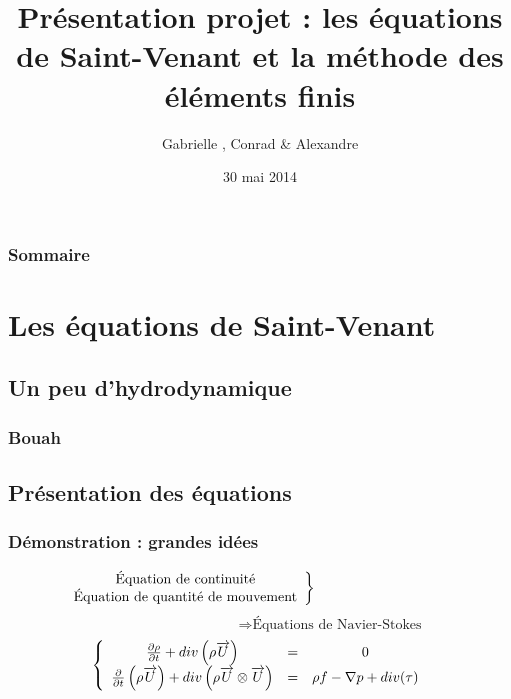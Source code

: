 \documentclass[handout]{beamer}
\title[Saint-Venant]{Présentation projet : les équations de Saint-Venant et la méthode des éléments finis}
\author{Gabrielle \bsc{Collette}, Conrad \bsc{Hillairet} \& Alexandre \bsc{Vieira}}
\institute{INSA de Rouen}
\date{30 mai 2014}
\begin{document}
\begin{frame}
\titlepage
\end{frame}

\begin{frame}
	\frametitle{Sommaire}
	\tableofcontents
\end{frame}

\section{Les équations de Saint-Venant}
\subsection[Hydrodynam.]{Un peu d'hydrodynamique} %
 
\begin{frame}
	\frametitle{Bouah}

\end{frame}

\subsection[Équations]{Présentation des équations}

\begin{frame}
	\frametitle{Démonstration : grandes idées}
	\[\hspace{-10em}\left.\begin{array}{c} \text{Équation de continuité} \\ \text{Équation de quantité de mouvement} \end{array}\right\}\] 
	\[\hspace{10em}\Rightarrow \text{Équations de Navier-Stokes} \]
	\[\left\{ \begin{array}{c c c}
	\frac{\partial \rho}{\partial t} + div\left(\rho \overrightarrow{U}\right)&=&0\\
	\frac{\partial}{\partial t} \left( \rho \overrightarrow{U} \right) + div\left( \rho \overrightarrow{U} \otimes \overrightarrow{U}\right) &=& \rho f -\nabla p + div(\tau)
\end{array}\right.\]
\end{frame}
\end{document}
